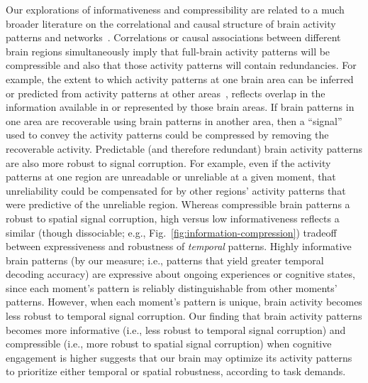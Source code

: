\documentclass[english, 11pt]{article}
\begin{document}
Our explorations of informativeness and compressibility are related to a much
broader literature on the correlational and causal structure of brain activity
patterns and networks~\citep{PretEtal17, OwenEtal21, RogeEtal07, RubiSpor10,
SizeEtal18, SmitEtal13b, SmitEtal13c, SrinEtal07, TomaVolk11, YeoEtal11,
AdacEtal12, BassSpor17, BullSpor09, SporHone06, SporBetz16, SporZwi04,
DhamEtal08, KorzEtal08, BrovEtal04, LynnBass21}. Correlations or causal
associations between different brain regions simultaneously imply that
full-brain activity patterns will be compressible and also that those activity
patterns will contain redundancies. For example, the extent to which activity
patterns at one brain area can be inferred or predicted from activity patterns
at other areas~\citep[e.g.,][]{OwenEtal20, ScanEtal21}, reflects overlap in the
information available in or represented by those brain areas. If brain patterns
in one area are recoverable using brain patterns in another area, then a
``signal'' used to convey the activity patterns could be compressed by removing
the recoverable activity. Predictable (and therefore redundant) brain activity
patterns are also more robust to signal corruption. For example, even if the
activity patterns at one region are unreadable or unreliable at a given moment,
that unreliability could be compensated for by other regions' activity patterns
that were predictive of the unreliable region. Whereas compressible brain
patterns a robust to spatial signal corruption, high versus low informativeness
reflects a similar (though dissociable; e.g.,
Fig.~\ref{fig:information-compression}) tradeoff between expressiveness and
robustness of \textit{temporal} patterns. Highly informative brain patterns (by
our measure; i.e., patterns that yield greater temporal decoding accuracy) are
expressive about ongoing experiences or cognitive states, since each moment's
pattern is reliably distinguishable from other moments' patterns. However, when
each moment's pattern is unique, brain activity becomes less robust to temporal
signal corruption. Our finding that brain activity patterns becomes more
informative (i.e., less robust to temporal signal corruption) and compressible
(i.e., more robust to spatial signal corruption) when cognitive engagement is
higher suggests that our brain may optimize its activity patterns to prioritize
either temporal or spatial robustness, according to task demands.
\end{document}
